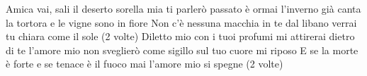 \beginverse
Amica vai, sali il deserto
sorella mia ti parlerò
passato è ormai l'inverno già
canta la tortora e le vigne sono in fiore
\endverse
\beginchorus
Non c'è nessuna macchia in te
dal libano verrai
tu chiara come il sole (2 volte)
\endchorus
\beginverse
Diletto mio con i tuoi profumi
mi attirerai dietro di te
l'amore mio non sveglierò
come sigillo sul tuo cuore mi riposo
\endverse
\beginchorus
E se la morte è forte e se
tenace è il fuoco mai
l'amore mio si spegne (2 volte)
\endchorus
\endsong
